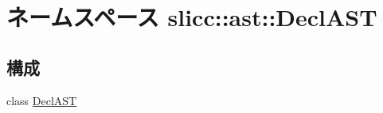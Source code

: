 \hypertarget{namespaceslicc_1_1ast_1_1DeclAST}{
\section{ネームスペース slicc::ast::DeclAST}
\label{namespaceslicc_1_1ast_1_1DeclAST}
}
\subsection*{構成}
\begin{DoxyCompactItemize}
\item 
class \hyperlink{classslicc_1_1ast_1_1DeclAST_1_1DeclAST}{DeclAST}
\end{DoxyCompactItemize}
